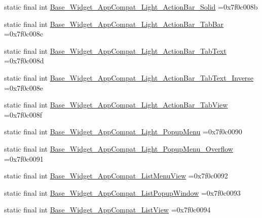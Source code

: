\begin{DoxyCompactItemize}
\item 
static final int \mbox{\hyperlink{classbr_1_1unb_1_1cic_1_1mp_1_1marketmaster_1_1test_1_1R_1_1style_a0db00de080d3bdb19edd0d6ab01f676f}{Base\+\_\+\+Widget\+\_\+\+App\+Compat\+\_\+\+Light\+\_\+\+Action\+Bar\+\_\+\+Solid}} =0x7f0c008b
\item 
static final int \mbox{\hyperlink{classbr_1_1unb_1_1cic_1_1mp_1_1marketmaster_1_1test_1_1R_1_1style_a4ba7e8a299c976c8177510f04cb5928e}{Base\+\_\+\+Widget\+\_\+\+App\+Compat\+\_\+\+Light\+\_\+\+Action\+Bar\+\_\+\+Tab\+Bar}} =0x7f0c008c
\item 
static final int \mbox{\hyperlink{classbr_1_1unb_1_1cic_1_1mp_1_1marketmaster_1_1test_1_1R_1_1style_a1dce45f71a5bf4a897c8f2b8905d9562}{Base\+\_\+\+Widget\+\_\+\+App\+Compat\+\_\+\+Light\+\_\+\+Action\+Bar\+\_\+\+Tab\+Text}} =0x7f0c008d
\item 
static final int \mbox{\hyperlink{classbr_1_1unb_1_1cic_1_1mp_1_1marketmaster_1_1test_1_1R_1_1style_aa1773d61bed27117ec7020a89ed68d70}{Base\+\_\+\+Widget\+\_\+\+App\+Compat\+\_\+\+Light\+\_\+\+Action\+Bar\+\_\+\+Tab\+Text\+\_\+\+Inverse}} =0x7f0c008e
\item 
static final int \mbox{\hyperlink{classbr_1_1unb_1_1cic_1_1mp_1_1marketmaster_1_1test_1_1R_1_1style_a7cc4dfa4e6b7287509c747fb76dd0ae9}{Base\+\_\+\+Widget\+\_\+\+App\+Compat\+\_\+\+Light\+\_\+\+Action\+Bar\+\_\+\+Tab\+View}} =0x7f0c008f
\item 
static final int \mbox{\hyperlink{classbr_1_1unb_1_1cic_1_1mp_1_1marketmaster_1_1test_1_1R_1_1style_a100611e042f4d8aad5cf0ace8361d92a}{Base\+\_\+\+Widget\+\_\+\+App\+Compat\+\_\+\+Light\+\_\+\+Popup\+Menu}} =0x7f0c0090
\item 
static final int \mbox{\hyperlink{classbr_1_1unb_1_1cic_1_1mp_1_1marketmaster_1_1test_1_1R_1_1style_aa428348b24c5f8686e3afea45773652f}{Base\+\_\+\+Widget\+\_\+\+App\+Compat\+\_\+\+Light\+\_\+\+Popup\+Menu\+\_\+\+Overflow}} =0x7f0c0091
\item 
static final int \mbox{\hyperlink{classbr_1_1unb_1_1cic_1_1mp_1_1marketmaster_1_1test_1_1R_1_1style_a25e3b39798854f5a098c9d618ff6656e}{Base\+\_\+\+Widget\+\_\+\+App\+Compat\+\_\+\+List\+Menu\+View}} =0x7f0c0092
\item 
static final int \mbox{\hyperlink{classbr_1_1unb_1_1cic_1_1mp_1_1marketmaster_1_1test_1_1R_1_1style_a9fb948884e2d7fce69fc65425d6510bb}{Base\+\_\+\+Widget\+\_\+\+App\+Compat\+\_\+\+List\+Popup\+Window}} =0x7f0c0093
\item 
static final int \mbox{\hyperlink{classbr_1_1unb_1_1cic_1_1mp_1_1marketmaster_1_1test_1_1R_1_1style_a923c4f238ff261398f10c0da3966f6ca}{Base\+\_\+\+Widget\+\_\+\+App\+Compat\+\_\+\+List\+View}} =0x7f0c0094

\end{DoxyCompactItemize}
